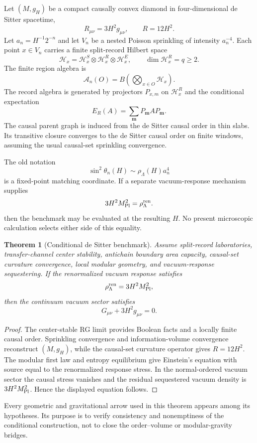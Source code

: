 \documentclass[11pt]{article}
\newtheorem{theorem}{Theorem}[section]
\newcommand{\A}{\mathcal A}
\newcommand{\Hh}{\mathcal H}
\begin{document}
Let $(M,g_H)$ be a compact causally convex diamond in four-dimensional de Sitter spacetime,
\[
R_{\mu\nu}=3H^2g_{\mu\nu},\qquad R=12H^2.
\]
Let $a_n=H^{-1}2^{-n}$ and let $V_n$ be a nested Poisson sprinkling of intensity $a_n^{-4}$.  Each point $x\in V_n$ carries a finite split-record Hilbert space
\[
\Hh_x=\Hh_x^S\otimes\Hh_x^R\otimes\Hh_x^E,
\qquad \dim\Hh_x^R=q\ge2.
\]
The finite region algebra is
\[
\A_n(O)=B\left(\bigotimes_{x\in O}\Hh_x\right).
\]
The record algebra is generated by projectors $P_{x,m}$ on $\Hh_x^R$ and the conditional expectation
\[
E_R(A)=\sum_{\mathbf m}P_{\mathbf m}AP_{\mathbf m}.
\]
The causal parent graph is induced from the de Sitter causal order in thin slabs.  Its transitive closure converges to the de Sitter causal order on finite windows, assuming the usual causal-set sprinkling convergence.

The old notation
\[
\sin^2\theta_n(H)\sim \rho_\Lambda(H)a_n^4
\]
is a fixed-point matching coordinate.  If a separate vacuum-response
mechanism supplies
\[
3H^2M_{\rm Pl}^2=\rho_\Lambda^{\rm ren}.
\]
then the benchmark may be evaluated at the resulting \(H\).  No present
microscopic calculation selects either side of this equality.

\begin{theorem}[Conditional de Sitter benchmark]
Assume split-record laboratories, transfer-channel center stability, antichain boundary area capacity, causal-set curvature convergence, local modular geometry, and vacuum-response sequestering.  If the renormalized vacuum response satisfies
\[
\rho_\Lambda^{\rm ren}=3H^2M_{\rm Pl}^2,
\]
then the continuum vacuum sector satisfies
\[
G_{\mu\nu}+3H^2g_{\mu\nu}=0.
\]
\end{theorem}

\begin{proof}
The center-stable RG limit provides Boolean facts and a locally finite causal order.  Sprinkling convergence and information-volume convergence reconstruct $(M,g_H)$, while the causal-set curvature operator gives $R=12H^2$.  The modular first law and entropy equilibrium give Einstein's equation with source equal to the renormalized response stress.  In the normal-ordered vacuum sector the causal stress vanishes and the residual sequestered vacuum density is $3H^2M_{\rm Pl}^2$.  Hence the displayed equation follows.
\end{proof}

Every geometric and gravitational arrow used in this theorem appears among
its hypotheses.  Its purpose is to verify consistency and nonemptiness of
the conditional construction, not to close the order--volume or
modular-gravity bridges.
\end{document}
